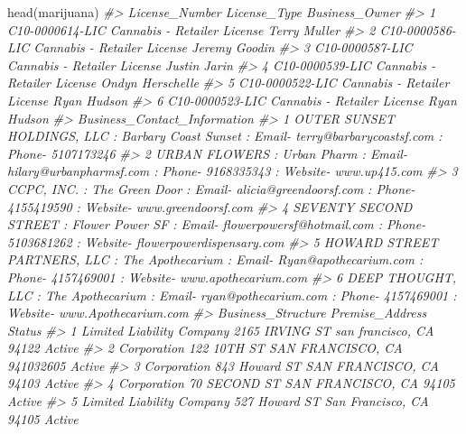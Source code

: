 \documentclass[
]{krantz}
\makeatletter
\newenvironment{Shaded}{\begin{snugshade}}{\end{snugshade}}
\newcommand{\CommentTok}[1]{\textcolor[rgb]{0.37,0.37,0.37}{\textit{#1}}}
\newcommand{\FunctionTok}[1]{\textcolor[rgb]{0,0,0}{#1}}
\newcommand{\NormalTok}[1]{#1}
\newenvironment{kframe}{%
\medskip{}
\setlength{\fboxsep}{.8em}
 \def\at@end@of@kframe{}%
 \ifinner\ifhmode%
  \def\at@end@of@kframe{\end{minipage}}%
  \begin{minipage}{\columnwidth}%
 \fi\fi%
 \def\FrameCommand##1{\hskip\@totalleftmargin \hskip-\fboxsep
 \colorbox{shadecolor}{##1}\hskip-\fboxsep
     \hskip-\linewidth \hskip-\@totalleftmargin \hskip\columnwidth}%
 \MakeFramed {\advance\hsize-\width
   \@totalleftmargin\z@ \linewidth\hsize
   \@setminipage}}%
 {\par\unskip\endMakeFramed%
 \at@end@of@kframe}
\renewenvironment{Shaded}{\begin{kframe}}{\end{kframe}}
\makeatother
\begin{document}
\begin{Shaded}
\begin{Highlighting}[]
\FunctionTok{head}\NormalTok{(marijuana)}
\CommentTok{\#\textgreater{}    License\_Number                License\_Type   Business\_Owner}
\CommentTok{\#\textgreater{} 1 C10{-}0000614{-}LIC Cannabis {-} Retailer License     Terry Muller}
\CommentTok{\#\textgreater{} 2 C10{-}0000586{-}LIC Cannabis {-} Retailer License    Jeremy Goodin}
\CommentTok{\#\textgreater{} 3 C10{-}0000587{-}LIC Cannabis {-} Retailer License     Justin Jarin}
\CommentTok{\#\textgreater{} 4 C10{-}0000539{-}LIC Cannabis {-} Retailer License Ondyn Herschelle}
\CommentTok{\#\textgreater{} 5 C10{-}0000522{-}LIC Cannabis {-} Retailer License      Ryan Hudson}
\CommentTok{\#\textgreater{} 6 C10{-}0000523{-}LIC Cannabis {-} Retailer License      Ryan Hudson}
\CommentTok{\#\textgreater{}                                                                                                           Business\_Contact\_Information}
\CommentTok{\#\textgreater{} 1                             OUTER SUNSET HOLDINGS, LLC  : Barbary Coast Sunset : Email{-} terry@barbarycoastsf.com : Phone{-} 5107173246}
\CommentTok{\#\textgreater{} 2                           URBAN FLOWERS  : Urban Pharm : Email{-} hilary@urbanpharmsf.com : Phone{-} 9168335343 : Website{-} www.up415.com}
\CommentTok{\#\textgreater{} 3                      CCPC, INC.  : The Green Door : Email{-} alicia@greendoorsf.com : Phone{-} 4155419590 : Website{-} www.greendoorsf.com}
\CommentTok{\#\textgreater{} 4 SEVENTY SECOND STREET  : Flower Power SF : Email{-} flowerpowersf@hotmail.com : Phone{-} 5103681262 : Website{-} flowerpowerdispensary.com}
\CommentTok{\#\textgreater{} 5   HOWARD STREET PARTNERS, LLC  : The Apothecarium : Email{-} Ryan@apothecarium.com : Phone{-} 4157469001 : Website{-} www.apothecarium.com}
\CommentTok{\#\textgreater{} 6              DEEP THOUGHT, LLC  : The Apothecarium : Email{-} ryan@pothecarium.com : Phone{-} 4157469001 : Website{-} www.Apothecarium.com}
\CommentTok{\#\textgreater{}          Business\_Structure                         Premise\_Address Status}
\CommentTok{\#\textgreater{} 1 Limited Liability Company  2165 IRVING ST san francisco, CA 94122 Active}
\CommentTok{\#\textgreater{} 2               Corporation 122 10TH ST SAN FRANCISCO, CA 941032605 Active}
\CommentTok{\#\textgreater{} 3               Corporation   843 Howard ST SAN FRANCISCO, CA 94103 Active}
\CommentTok{\#\textgreater{} 4               Corporation    70 SECOND ST SAN FRANCISCO, CA 94105 Active}
\CommentTok{\#\textgreater{} 5 Limited Liability Company   527 Howard ST San Francisco, CA 94105 Active}

\end{Highlighting}
\end{Shaded}
\end{document}
